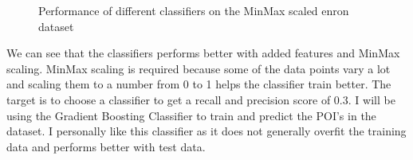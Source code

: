 \documentclass[12pt]{article}%
\begin{document}
\begin{figure}[!htbp]
\centering
  \hfill
  \caption{Performance of different classifiers on the MinMax scaled enron dataset}
\end{figure}

\newpage
We can see that the classifiers performs better with added features and MinMax scaling. MinMax scaling is required because some of the data points vary a lot and scaling them to a number from 0 to 1 helps the classifier train better. The target is to choose a classifier to get a recall and precision score of 0.3. I will be using the Gradient Boosting Classifier to train and predict the POI's in the dataset. I personally like this classifier as it does not generally overfit the training data and performs better with test data.
\\
\\
\end{document}
